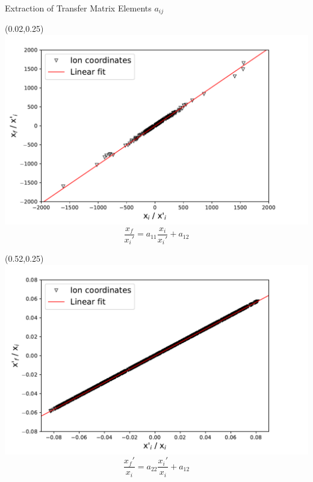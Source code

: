 \documentclass[10pt,aspectratio=169]{beamer}
\begin{document}
\begin{frame}{Extraction of Transfer Matrix Elements $a_{ij}$}
    \begin{textblock*}{0.5\paperwidth}(0.02\paperwidth,0.25\paperheight)
			\centering
			\includegraphics[width=.9\textwidth]{Exercises_presentation/images/FirstCoord_Eq.pdf}
            \begin{equation*}
                \frac{x_f}{x_i'} = a_{11}\frac{x_i}{x_i'} + a_{12}
            \end{equation*}
		\end{textblock*}
    \begin{textblock*}{0.5\paperwidth}(0.52\paperwidth,0.25\paperheight)
			\centering
			\includegraphics[width=.9\textwidth]{Exercises_presentation/images/SecondCoord_Eq.pdf}
            \begin{equation*}
                \frac{x_f'}{x_i} = a_{22}\frac{x_i'}{x_i} + a_{12}
            \end{equation*}
		\end{textblock*}
  
\end{frame}
\end{document}
